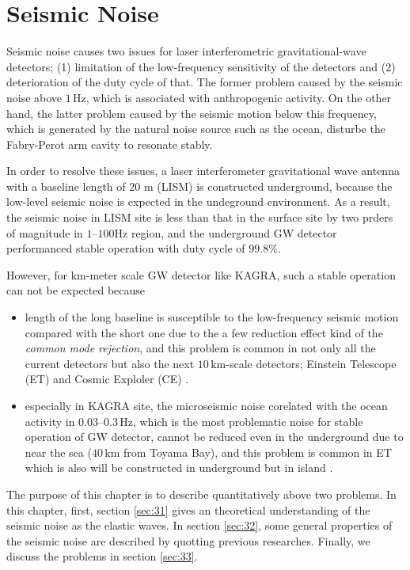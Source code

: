 \chapter{Seismic Noise} \label{chap2}
Seismic noise causes two issues for laser interferometric gravitational-wave detectors; (1) limitation of the low-frequency sensitivity of the detectors and (2) deterioration of the duty cycle of that. The former problem caused by the seismic noise above $1\,\mathrm{Hz}$, which is associated with anthropogenic activity. On the other hand, the latter problem caused by the seismic motion below this frequency, which is generated by the natural noise source such as the ocean, disturbe the Fabry-Perot arm cavity to resonate stably.

In order to resolve these issues, a laser interferometer gravitational wave antenna with a baseline length of 20 m (LISM) \cite{sato2004ultrastable} is constructed underground, because the low-level seismic noise is expected in the undeground environment. As a result, the seismic noise in LISM site is less than that in the surface site by two prders of magnitude in $1$--$100\mathrm{Hz}$ region, and the underground GW detector performanced stable operation with duty cycle of $99.8 \%$.

However, for km-meter scale GW detector like KAGRA, such a stable operation can not be expected because
\begin{itemize}
  \setlength{\itemsep}{1pt}      %
  \setlength{\parskip}{-1pt}     %
  \setlength{\itemindent}{0pt}   %
  \setlength{\labelsep}{5pt}     %
\item length of the long baseline is susceptible to the low-frequency seismic motion compared with the short one due to the a few reduction effect kind of the {\it common mode rejection}, and this problem is common in not only all the current detectors but also the next $10\,\mathrm{km}$-scale detectors; Einstein Telescope (ET)\cite{punturo2010einstein} and Cosmic Exploler (CE) \cite{abbott2017exploring}.
\item especially in KAGRA site, the microseismic noise corelated with the ocean activity in $0.03$--$0.3\,\mathrm{Hz}$, which is the most problematic noise for stable operation of GW detector, cannot be reduced even in the underground due to near the sea ($40\,\mathrm{km}$ from Toyama Bay), and this problem is common in ET which is also will be constructed in underground but in island \cite{naticchioni2014microseismic}.
\end{itemize}
The purpose of this chapter is to describe quantitatively above two problems. In this chapter, first, section \cref{sec:31} gives an theoretical understanding of the seismic noise as the elastic waves. In section \cref{sec:32}, some general properties of the seismic noise are described by quotting previous researches. Finally, we discuss the problems in section \cref{sec:33}.



